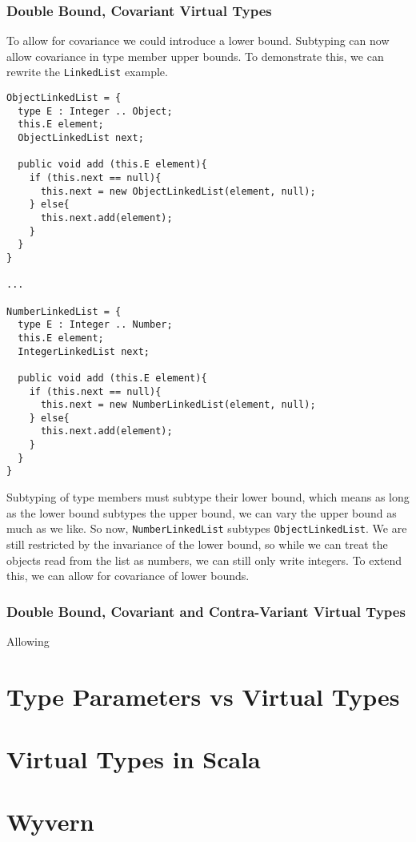 \documentclass[11pt
              , a4paper
              , twoside
              , openright
              ]{report}
\begin{document}
\subsubsection{Double Bound, Covariant Virtual Types}
To allow for covariance we could introduce a lower bound. Subtyping can now allow covariance in type member upper bounds. To demonstrate this, we can rewrite the \verb|LinkedList| example.
\begin{lstlisting}[mathescape, style=custom_lang]
ObjectLinkedList = {
  type E : Integer .. Object;
  this.E element;
  ObjectLinkedList next;
	
  public void add (this.E element){
    if (this.next == null){
      this.next = new ObjectLinkedList(element, null);
    } else{
      this.next.add(element);
    }
  }
}

...

NumberLinkedList = {
  type E : Integer .. Number;
  this.E element;
  IntegerLinkedList next;
	    
  public void add (this.E element){
    if (this.next == null){
      this.next = new NumberLinkedList(element, null);
    } else{
      this.next.add(element);
    }
  }
}
\end{lstlisting}
Subtyping of type members must subtype their lower bound, which means as long as the lower bound subtypes the upper bound, we can vary the upper bound as much as we like. So now, \verb|NumberLinkedList| subtypes \verb|ObjectLinkedList|. We are still restricted by the invariance of the lower bound, so while we can treat the objects read from the list as numbers, we can still only write integers. To extend this, we can allow for covariance of lower bounds.

\subsubsection{Double Bound, Covariant and Contra-Variant Virtual Types}
Allowing 

\section{Type Parameters vs Virtual Types}

\section{Virtual Types in Scala}

\section{Wyvern}
\end{document}
